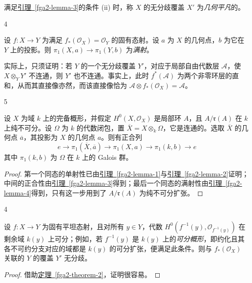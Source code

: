\par{}满足\hyperref[fga2-lemma-3]{引理~\ref*{fga2-lemma-3}}的条件 (ii) 时，称 \(X\) 的无分歧覆盖 \(X'\) 为\emph{几何平凡}的。
\begin{lemma}{4}\label{fga2-lemma-4}\skipsinglepar
\par{}设 \(f\colon  X\to  Y\) 为满足 \(f_*(\mathcal {O}_X)=\mathcal {O}_Y\) 的固有态射。设 \(a\) 为 \(X\) 的几何点，\(b\) 为它在 \(Y\) 上的投影。则 \(\pi _1(X,a)\to \pi _1(Y,b)\) 为\emph{满射}。\end{lemma}
\par{}实际上，只须证明：若 \(Y\) 的一个无分歧覆盖 \(Y'\)，对应于局部自由代数层 \(\mathscr {A}\)，使 \(X\otimes _YY'\) 不连通，则 \(Y'\) 也不连通。事实上，此时 \(f^*(\mathscr {A})\) 为两个非零环层的直和，从而其直接像亦然，而该直接像恰为 \(\mathscr {A}\otimes  f_*(\mathcal {O}_X)=\mathscr {A}\)。
\begin{lemma}{5}\label{fga2-lemma-5}\skipsinglepar
\par{}设 \(X\) 为域 \(k\) 上的完备概形，并假定 \(H^0(X,\mathcal {O}_X)\) 是局部环 \(A\)，且 \(A/\mathfrak {r}(A)\) 在 \(k\) 上纯不可分。设 \(\Omega \) 为 \(k\) 的代数闭包，置 \(\overline {X}=X\otimes _k\Omega \)，它是连通的。选取 \(\overline {X}\) 的几何点 \(\overline {a}\)，其投影为 \(X\) 的几何点 \(a\)。则有正合列 \[       e       \to  \pi _1(\overline {X},\overline {a})       \to  \pi _1(X,a)       \to  \pi _1(k,b)       \to  e     \] 其中 \(\pi _1(k,b)\) 为 \(\Omega \) 在 \(k\) 上的 Galois 群。
\begin{proof}
\par{}第一个同态的单射性已由\hyperref[fga2-lemma-1]{引理~\ref*{fga2-lemma-1}}与\hyperref[fga2-lemma-2]{引理~\ref*{fga2-lemma-2}}证明；中间的正合性由\hyperref[fga2-lemma-3]{引理~\ref*{fga2-lemma-3}}得到；最后一个同态的满射性由\hyperref[fga2-lemma-4]{引理~\ref*{fga2-lemma-4}}得到，只有这一步用到了 \(A/\mathfrak {r}(A)\) 为纯不可分扩张。\end{proof}\end{lemma}
\begin{proposition}{4}\label{fga2-proposition-4}\skipsinglepar
\par{}设 \(f\colon  X\to  Y\) 为固有平坦态射，且对所有 \(y\in  Y\)，代数 \(H^0(f^{-1}(y),\mathcal {O}_{f^{-1}(y)})\) 在剩余域 \(k(y)\) 上可分；例如，若 \(f^{-1}(y)\) 是 \(k(y)\) 上的\emph{可分概形}，即约化且其各不可约分支对应的域都是 \(k(y)\) 的可分扩张，便满足此条件。则与 \(f_*(\mathcal {O}_X)\) 关联的 \(Y\) 的覆盖 \(Y'\) 无分歧。
\begin{proof}
\par{}借助\hyperref[fga2-theorem-2]{定理~\ref*{fga2-theorem-2}}，证明很容易。\end{proof}\end{proposition}
